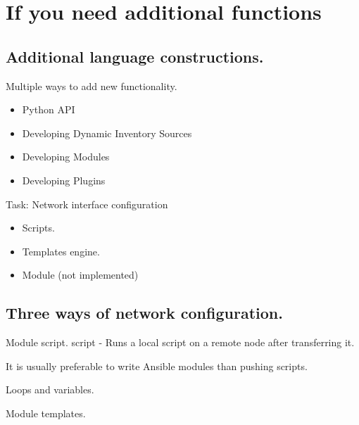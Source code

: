 \documentclass[16pt]{beamer}
\begin{document}
\section{If you need additional functions}
\subsection {Additional language constructions.}
\begin{frame}{Multiple ways to add new functionality.}
  \begin{itemize}
  \item
    Python API
  \item
    Developing Dynamic Inventory Sources
  \item
    Developing Modules
  \item
    Developing Plugins
  \end{itemize}
 Task: Network interface configuration
  \begin{itemize}
  \item
    Scripts.
  \item
    Templates engine.
  \item
    Module (not implemented) 
  \end{itemize}
\end{frame}

\subsection {Three ways of network configuration.}

\begin{frame}{Module script.}
  script - Runs a local script on a remote node after transferring it.
  
  It is usually preferable to write Ansible modules than pushing scripts.
\end{frame}

\begin{frame}{Loops and variables.}
  
  
\end{frame}

\begin{frame}{Module templates.}
  
  
  
\end{frame}
\end{document}
